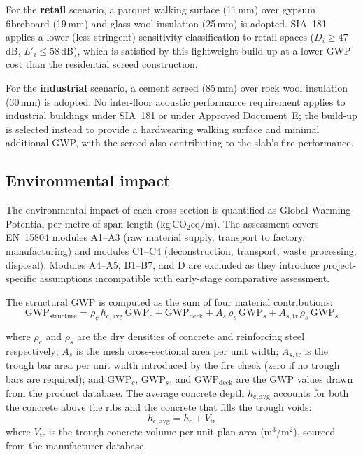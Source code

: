 For the \textbf{retail} scenario, a parquet walking surface (11\,mm) over gypsum fibreboard (19\,mm) and glass wool insulation (25\,mm) is adopted. SIA~181 applies a lower (less stringent) sensitivity classification to retail spaces ($D_i \ge 47$\,dB, $L'_i \le 58$\,dB), which is satisfied by this lightweight build-up at a lower GWP cost than the residential screed construction.

For the \textbf{industrial} scenario, a cement screed (85\,mm) over rock wool insulation (30\,mm) is adopted. No inter-floor acoustic performance requirement applies to industrial buildings under SIA~181 or under Approved Document~E; the build-up is selected instead to provide a hardwearing walking surface and minimal additional GWP, with the screed also contributing to the slab's fire performance.

\subsection{Environmental impact}
\label{sec:env_impact}
The environmental impact of each cross-section is quantified as Global Warming Potential per metre of span length (kg\,CO$_2$eq/m). The assessment covers EN~15804 modules A1--A3 (raw material supply, transport to factory, manufacturing) and modules C1--C4 (deconstruction, transport, waste processing, disposal). Modules A4--A5, B1--B7, and D are excluded as they introduce project-specific assumptions incompatible with early-stage comparative assessment.

The structural GWP is computed as the sum of four material contributions:
\begin{equation}
    \mathrm{GWP}_\mathrm{structure} = \rho_c \, h_\mathrm{c,avg} \, \mathrm{GWP}_c + \mathrm{GWP}_\mathrm{deck} + A_s \, \rho_s \, \mathrm{GWP}_s + A_{s,\mathrm{tr}} \, \rho_s \, \mathrm{GWP}_s
    \label{eq:gwp_structure}
\end{equation}

where $\rho_c$ and $\rho_s$ are the dry densities of concrete and reinforcing steel respectively; $A_s$ is the mesh cross-sectional area per unit width; $A_{s,\mathrm{tr}}$ is the trough bar area per unit width introduced by the fire check (zero if no trough bars are required); and $\mathrm{GWP}_c$, $\mathrm{GWP}_s$, and $\mathrm{GWP}_\mathrm{deck}$ are the GWP values drawn from the product database. The average concrete depth $h_\mathrm{c,avg}$ accounts for both the concrete above the ribs and the concrete that fills the trough voids:
\begin{equation}
    h_\mathrm{c,avg} = h_c + V_\mathrm{tr}
    \label{eq:hcavg}
\end{equation}
where $V_\mathrm{tr}$ is the trough concrete volume per unit plan area (m$^3$/m$^2$), sourced from the manufacturer database.

